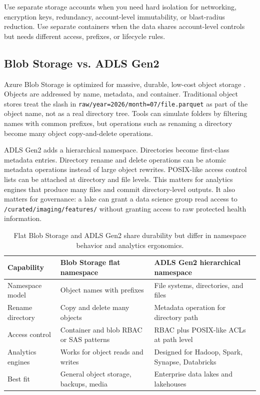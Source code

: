 \begin{tipbox}
Use separate storage accounts when you need hard isolation for networking, encryption keys, redundancy, account-level immutability, or blast-radius reduction. Use separate containers when the data shares account-level controls but needs different access, prefixes, or lifecycle rules.
\end{tipbox}

\subsection{Blob Storage vs. ADLS Gen2}
Azure Blob Storage is optimized for massive, durable, low-cost object storage \cite{microsoft2025blobstorage}. Objects are addressed by name, metadata, and container. Traditional object stores treat the slash in \texttt{raw/year=2026/month=07/file.parquet} as part of the object name, not as a real directory tree. Tools can simulate folders by filtering names with common prefixes, but operations such as renaming a directory become many object copy-and-delete operations.

ADLS Gen2 adds a hierarchical namespace. Directories become first-class metadata entries. Directory rename and delete operations can be atomic metadata operations instead of large object rewrites. POSIX-like access control lists can be attached at directory and file levels. This matters for analytics engines that produce many files and commit directory-level outputs. It also matters for governance: a lake can grant a data science group read access to \texttt{/curated/imaging/features/} without granting access to raw protected health information.

\begin{table}[H]
\centering
\small
\begin{tabular}{@{}p{3.3cm}p{4.8cm}p{5.4cm}@{}}
\toprule
\textbf{Capability} & \textbf{Blob Storage flat namespace} & \textbf{ADLS Gen2 hierarchical namespace} \\
\midrule
Namespace model & Object names with prefixes & File systems, directories, and files \\
Rename directory & Copy and delete many objects & Metadata operation for directory path \\
Access control & Container and blob RBAC or SAS patterns & RBAC plus POSIX-like ACLs at path level \\
Analytics engines & Works for object reads and writes & Designed for Hadoop, Spark, Synapse, Databricks \\
Best fit & General object storage, backups, media & Enterprise data lakes and lakehouses \\
\bottomrule
\end{tabular}
\caption{Flat Blob Storage and ADLS Gen2 share durability but differ in namespace behavior and analytics ergonomics.}
\label{tab:blob-vs-adls}
\end{table}


